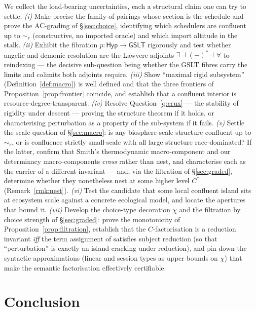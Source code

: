 \documentclass[11pt]{article}
\theoremstyle{definition}
\theoremstyle{plain}
\theoremstyle{remark}
\newcommand{\rbisim}{\sim_{r}}
\newcommand{\GSLT}{\mathsf{GSLT}}
\newcommand{\Hyp}{\mathsf{Hyp}}
\begin{document}
We collect the load-bearing uncertainties, each a structural claim one can try to settle.
\emph{(i)} Make precise the family-of-pairings whose section is the schedule and prove the
$\mathrm{AC}$-grading of \S\ref{sec:choice}, identifying which schedulers are confluent up
to $\rbisim$ (constructive, no imported oracle) and which import altitude in the stalk.
\emph{(ii)} Exhibit the fibration $p\colon\Hyp\to\GSLT$ rigorously and test whether angelic
and demonic resolution are the Lawvere adjoints $\exists \dashv (-)^{*} \dashv \forall$ to
reindexing --- the decisive sub-question being whether the GSLT fibres carry the limits and
colimits both adjoints require. \emph{(iii)} Show ``maximal rigid subsystem''
(Definition~\ref{def:macro}) is well defined and that the three frontiers of
Proposition~\ref{prop:frontier} coincide, and establish that a confluent interior is
resource-degree-transparent. \emph{(iv)} Resolve Question~\ref{q:crux} --- the stability of
rigidity under descent --- proving the structure theorem if it holds, or characterising
perturbation as a property of the sub-system if it fails. \emph{(v)} Settle the scale
question of \S\ref{sec:macro}: is any biosphere-scale structure confluent up to $\rbisim$,
or is confluence strictly small-scale with all large structure race-dominated? If the
latter, confirm that Smith's thermodynamic macro-component and our determinacy
macro-components \emph{cross} rather than nest, and characterise each as the carrier of a
different invariant --- and, via the filtration of \S\ref{sec:graded}, determine whether they
nonetheless nest at some higher level $C^{*}$ (Remark~\ref{rmk:nest}). \emph{(vi)} Test the
candidate that some local confluent island sits at ecosystem scale against a concrete ecological
model, and locate the apertures that bound it. \emph{(vii)} Develop the choice-type decoration
$\chi$ and the filtration by choice strength of \S\ref{sec:graded}: prove the monotonicity of
Proposition~\ref{prop:filtration}, establish that the $C$-factorisation is a reduction invariant
\emph{iff} the term assignment of \cite{choicesched} satisfies subject reduction (so that
``perturbation'' is exactly an island cracking under reduction), and pin down the syntactic
approximations (linear and session types as upper bounds on $\chi$) that make the semantic
factorisation effectively certifiable.

\section{Conclusion}
\end{document}
